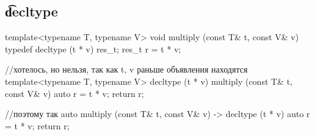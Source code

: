 \subsection{\t{decltype}}
\begin{cppcode}
template<typename T, typename V>
void multiply (const T& t, const V& v) {
	typedef decltype (t * v) res_t;
	res_t r = t * v;
}

//хотелось, но нельзя, так как t, v раньше объявления находятся
template<typename T, typename V>
decltype (t * v) multiply (const T& t, const V& v) {
	auto r = t * v;
	return r;
}

//поэтому так
auto multiply (const T& t, const V& v) -> decltype (t * v) {
	auto r = t * v;
	return r;
}
\end{cppcode}
